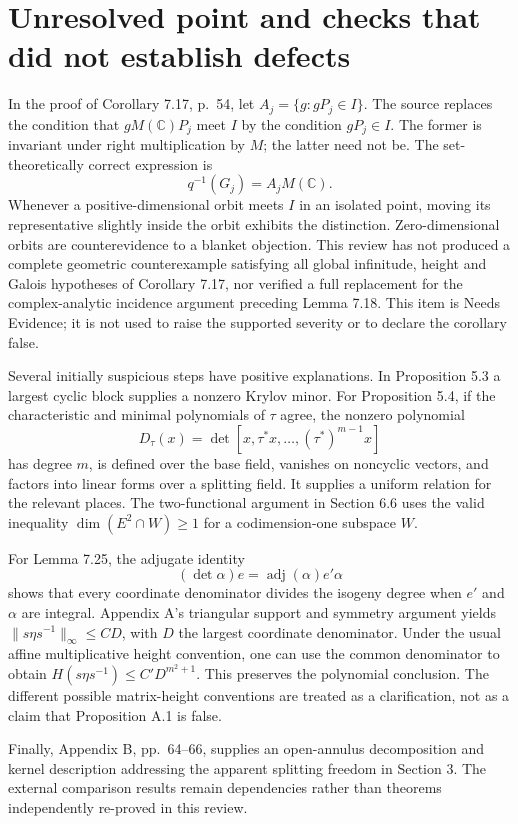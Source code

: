 \documentclass[10pt]{article}
\begin{document}
\section*{Unresolved point and checks that did not establish defects}
In the proof of Corollary 7.17, p. 54, let \(A_j=\{g:gP_j\in I\}\). The source replaces the condition that \(gM(\mathbb C)P_j\) meet \(I\) by the condition \(gP_j\in I\). The former is invariant under right multiplication by \(M\); the latter need not be. The set-theoretically correct expression is \[q^{-1}(G_j)=A_jM(\mathbb C).\] Whenever a positive-dimensional orbit meets \(I\) in an isolated point, moving its representative slightly inside the orbit exhibits the distinction. Zero-dimensional orbits are counterevidence to a blanket objection. This review has not produced a complete geometric counterexample satisfying all global infinitude, height and Galois hypotheses of Corollary 7.17, nor verified a full replacement for the complex-analytic incidence argument preceding Lemma 7.18. This item is Needs Evidence; it is not used to raise the supported severity or to declare the corollary false.\par
Several initially suspicious steps have positive explanations. In Proposition 5.3 a largest cyclic block supplies a nonzero Krylov minor. For Proposition 5.4, if the characteristic and minimal polynomials of \(\tau\) agree, the nonzero polynomial \[D_\tau(x)=\det[x,\tau^*x,\ldots,(\tau^*)^{m-1}x]\] has degree \(m\), is defined over the base field, vanishes on noncyclic vectors, and factors into linear forms over a splitting field. It supplies a uniform relation for the relevant places. The two-functional argument in Section 6.6 uses the valid inequality \(\dim(E^2\cap W)\geq1\) for a codimension-one subspace \(W\).\par
For Lemma 7.25, the adjugate identity \[(\det\alpha)e=\operatorname{adj}(\alpha)e'\alpha\] shows that every coordinate denominator divides the isogeny degree when \(e'\) and \(\alpha\) are integral. Appendix A’s triangular support and symmetry argument yields \(\|s\eta s^{-1}\|_\infty\leq C D\), with \(D\) the largest coordinate denominator. Under the usual affine multiplicative height convention, one can use the common denominator to obtain \(H(s\eta s^{-1})\leq C'D^{m^2+1}\). This preserves the polynomial conclusion. The different possible matrix-height conventions are treated as a clarification, not as a claim that Proposition A.1 is false.\par
Finally, Appendix B, pp. 64–66, supplies an open-annulus decomposition and kernel description addressing the apparent splitting freedom in Section 3. The external comparison results remain dependencies rather than theorems independently re-proved in this review.\par
\end{document}
